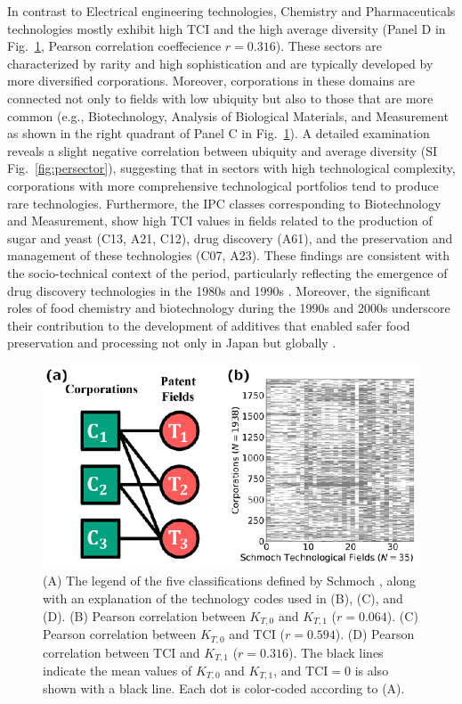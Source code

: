 In contrast to Electrical engineering technologies, Chemistry and Pharmaceuticals technologies mostly exhibit high TCI and the high average diversity (Panel D in Fig.~\ref{fig:scatter}, Pearson correlation coeffecience $r=0.316$).
These sectors are characterized by rarity and high sophistication and are typically developed by more diversified corporations. 
Moreover, corporations in these domains are connected not only to fields with low ubiquity but also to those that are more common (e.g., Biotechnology, Analysis of Biological Materials, and Measurement as shown in the right quadrant of Panel C in Fig.~\ref{fig:scatter}). 
A detailed examination reveals a slight negative correlation between ubiquity and average diversity (SI Fig.~\ref{fig:persector}), suggesting that in sectors with high technological complexity, corporations with more comprehensive technological portfolios tend to produce rare technologies. 
Furthermore, the IPC classes corresponding to Biotechnology and Measurement, show high TCI values in fields related to the production of sugar and yeast (C13, A21, C12), drug discovery (A61), and the preservation and management of these technologies (C07, A23). These findings are consistent with the socio-technical context of the period, particularly reflecting the emergence of drug discovery technologies in the 1980s and 1990s \cite{Sakakibara2014,Nakamura2022}. Moreover, the significant roles of food chemistry and biotechnology during the 1990s and 2000s underscore their contribution to the development of additives that enabled safer food preservation and processing not only in Japan but globally \cite{Bhatia2018,Murakami2024}.

\begin{figure}[ht]
    \centering
    \includegraphics[scale=1.00]{Figs/Fig1.eps}
    \caption{(A) The legend of the five classifications defined by Schmoch \cite{Schmoch2008}, along with an explanation of the technology codes used in (B), (C), and (D).
    (B) Pearson correlation between \(K_{T,0}\) and \(K_{T,1}\) (\(r=0.064\)).
    (C) Pearson correlation between \(K_{T,0}\) and TCI (\(r=0.594\)).
    (D) Pearson correlation between TCI and \(K_{T,1}\) (\(r=0.316\)).
    The black lines indicate the mean values of \(K_{T,0}\) and \(K_{T,1}\), and \(\text{TCI} = 0\) is also shown with a black line. Each dot is color‐coded according to (A).
    }
    \label{fig:scatter}
\end{figure}
